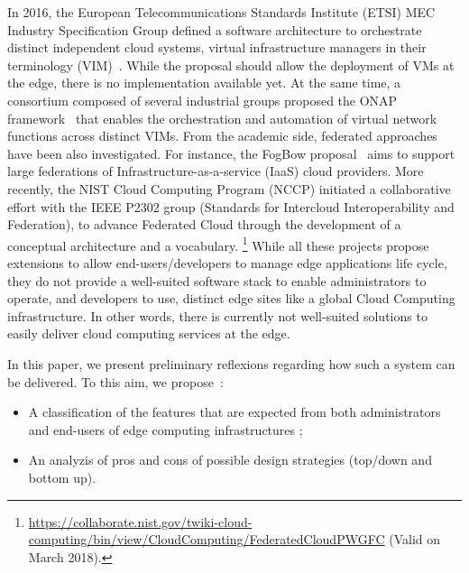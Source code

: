 In 2016, the European Telecommunications Standards Institute (ETSI) MEC
Industry Specification Group defined  a software architecture
to orchestrate distinct independent cloud systems, \aka virtual
infrastructure managers in their terminology
(VIM)~\cite{7574435}. While the proposal should allow the deployment
of VMs at the edge, there is no implementation available yet.  At the
same time, a consortium composed of several industrial groups proposed
the ONAP framework~\cite{onap} that enables the orchestration and
automation of virtual network functions across distinct VIMs.  From
the academic side, federated approaches have been also investigated.
For instance, the FogBow proposal~\cite{brasileiro2016fogbow} aims to
support large federations of Infrastructure-as-a-service (IaaS) cloud
providers. More recently, the NIST Cloud Computing Program (NCCP)
initiated a collaborative effort with the IEEE P2302 group (Standards for Intercloud Interoperability and
Federation), to advance Federated Cloud through the development
of a conceptual architecture and a vocabulary.
\footnote{\url{https://collaborate.nist.gov/twiki-cloud-computing/bin/view/CloudComputing/FederatedCloudPWGFC} (Valid on March 2018).}
%
While all these projects propose extensions to %
allow end-users/developers to manage edge applications life cycle,
they do not provide a well-suited software stack to enable
administrators to operate, and developers to use, distinct edge sites
like a global Cloud Computing infrastructure. In other words, there is
currently not well-suited solutions to easily deliver cloud computing
services at the edge.
%
%

In this paper, we present preliminary reflexions regarding how such a
system can be delivered. To this aim, we propose~:
\begin{itemize}
\item A classification of the features that are expected from both
  administrators and end-users of edge computing infrastructures
  ; %
\item An analyzis of pros and cons of possible design strategies
  (top/down and bottom up).
\end{itemize}

